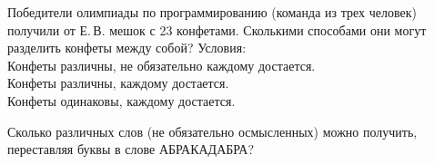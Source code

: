 %
%



\begin{problems}

\item
Победители олимпиады по программированию (команда из трех человек) получили от
Е.\,В. мешок с 23 конфетами.
Сколькими способами они могут разделить конфеты между собой?
Условия:
\\
\sbp Конфеты различны, не обязательно каждому достается.
\\
\sbp Конфеты различны, каждому достается.
\\
\sbp Конфеты одинаковы, каждому достается.

\item
Сколько различных слов (не обязательно осмысленных) можно получить, переставляя
буквы в слове АБРАКАДАБРА?


\end{problems}
 
